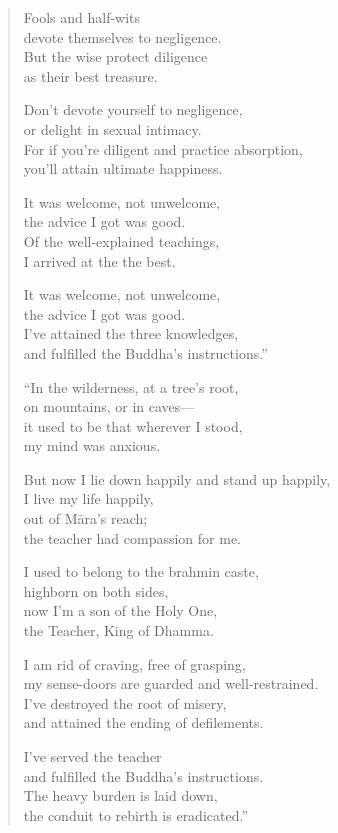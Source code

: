 \documentclass[12pt,openany]{book}%
\begin{document}
\begin{verse}
Fools and half-wits \\
devote themselves to negligence. \\
But the wise protect diligence \\
as their best treasure. 

Don’t devote yourself to negligence, \\
or delight in sexual intimacy. \\
For if you’re diligent and practice absorption, \\
you’ll attain ultimate happiness. 

It was welcome, not unwelcome, \\
the advice I got was good. \\
Of the well-explained teachings, \\
I arrived at the the best. 

It was welcome, not unwelcome, \\
the advice I got was good. \\
I’ve attained the three knowledges, \\
and fulfilled the Buddha’s instructions.” 

“In the wilderness, at a tree’s root, \\
on mountains, or in caves—\\
it used to be that wherever I stood, \\
my mind was anxious. 

But now I lie down happily and stand up happily, \\
I live my life happily, \\
out of \textsanskrit{Māra}’s reach; \\
the teacher had compassion for me. 

I used to belong to the brahmin caste, \\
highborn on both sides, \\
now I’m a son of the Holy One, \\
the Teacher, King of Dhamma. 

I am rid of craving, free of grasping, \\
my sense-doors are guarded and well-restrained. \\
I’ve destroyed the root of misery, \\
and attained the ending of defilements. 

I’ve served the teacher \\
and fulfilled the Buddha’s instructions. \\
The heavy burden is laid down, \\
the conduit to rebirth is eradicated.” 

%
\end{verse}
\end{document}
